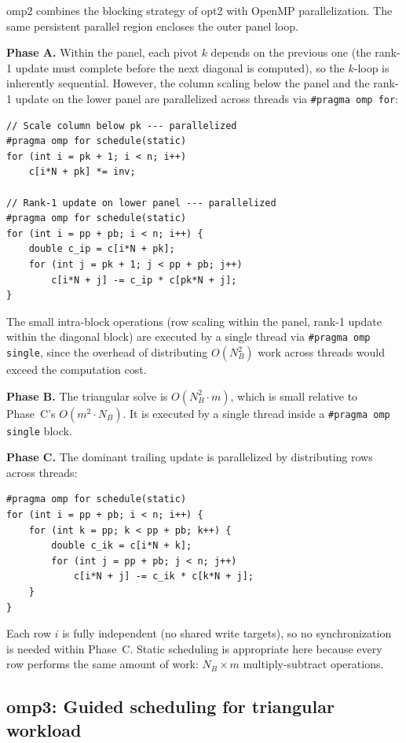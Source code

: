 \documentclass[10pt,leqno]{amsart}
\begin{document}
omp2 combines the blocking strategy of opt2 with OpenMP parallelization. The 
same persistent parallel region encloses the outer panel loop.

\noindent\textbf{Phase A.} Within the panel, each pivot $k$ depends on the 
previous one (the rank-1 update must complete before the next diagonal is 
computed), so the $k$-loop is inherently sequential. However, the column 
scaling below the panel and the rank-1 update on the lower panel are 
parallelized across threads via \texttt{\#pragma omp for}:

\begin{lstlisting}
// Scale column below pk --- parallelized
#pragma omp for schedule(static)
for (int i = pk + 1; i < n; i++)
    c[i*N + pk] *= inv;

// Rank-1 update on lower panel --- parallelized
#pragma omp for schedule(static)
for (int i = pp + pb; i < n; i++) {
    double c_ip = c[i*N + pk];
    for (int j = pk + 1; j < pp + pb; j++)
        c[i*N + j] -= c_ip * c[pk*N + j];
}
\end{lstlisting}

The small intra-block operations (row scaling within the panel, rank-1 
update within the diagonal block) are executed by a single thread via 
\texttt{\#pragma omp single}, since the overhead of distributing $O(N_B^2)$ 
work across threads would exceed the computation cost.

\noindent\textbf{Phase B.} The triangular solve is $O(N_B^2 \cdot m)$, which 
is small relative to Phase~C's $O(m^2 \cdot N_B)$. It is executed by a 
single thread inside a \texttt{\#pragma omp single} block.

\noindent\textbf{Phase C.} The dominant trailing update is parallelized by 
distributing rows across threads:

\begin{lstlisting}
#pragma omp for schedule(static)
for (int i = pp + pb; i < n; i++) {
    for (int k = pp; k < pp + pb; k++) {
        double c_ik = c[i*N + k];
        for (int j = pp + pb; j < n; j++)
            c[i*N + j] -= c_ik * c[k*N + j];
    }
}
\end{lstlisting}

Each row $i$ is fully independent (no shared write targets), so no 
synchronization is needed within Phase~C. Static scheduling is appropriate 
here because every row performs the same amount of work: $N_B \times m$ 
multiply-subtract operations.

\subsection{omp3: Guided scheduling for triangular workload}
\end{document}
